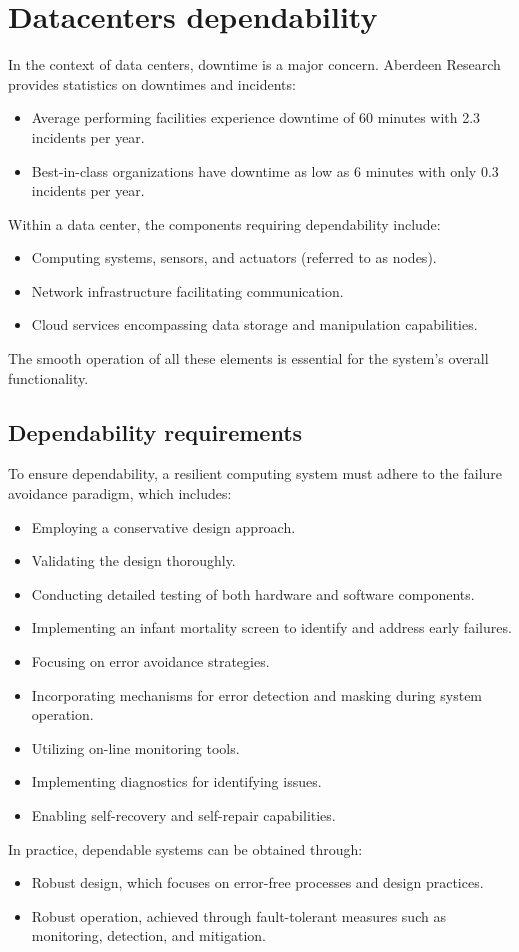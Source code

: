 \section{Datacenters dependability}

In the context of data centers, downtime is a major concern. 
Aberdeen Research provides statistics on downtimes and incidents:
\begin{itemize}
    \item Average performing facilities experience downtime of 60 minutes with 2.3 incidents per year.
    \item Best-in-class organizations have downtime as low as 6 minutes with only 0.3 incidents per year.
\end{itemize}

Within a data center, the components requiring dependability include:
\begin{itemize}
    \item Computing systems, sensors, and actuators (referred to as nodes).
    \item Network infrastructure facilitating communication.
    \item Cloud services encompassing data storage and manipulation capabilities.
\end{itemize}
The smooth operation of all these elements is essential for the system's overall functionality.

\subsection{Dependability requirements}
To ensure dependability, a resilient computing system must adhere to the failure avoidance paradigm, which includes:
\begin{itemize}
    \item Employing a conservative design approach.
    \item Validating the design thoroughly.
    \item Conducting detailed testing of both hardware and software components.
    \item Implementing an infant mortality screen to identify and address early failures.
    \item Focusing on error avoidance strategies.
    \item Incorporating mechanisms for error detection and masking during system operation.
    \item Utilizing on-line monitoring tools.
    \item Implementing diagnostics for identifying issues.
    \item Enabling self-recovery and self-repair capabilities.
\end{itemize}
In practice, dependable systems can be obtained through:
\begin{itemize}
    \item Robust design, which focuses on error-free processes and design practices.
    \item Robust operation, achieved through fault-tolerant measures such as monitoring, detection, and mitigation.
\end{itemize}

